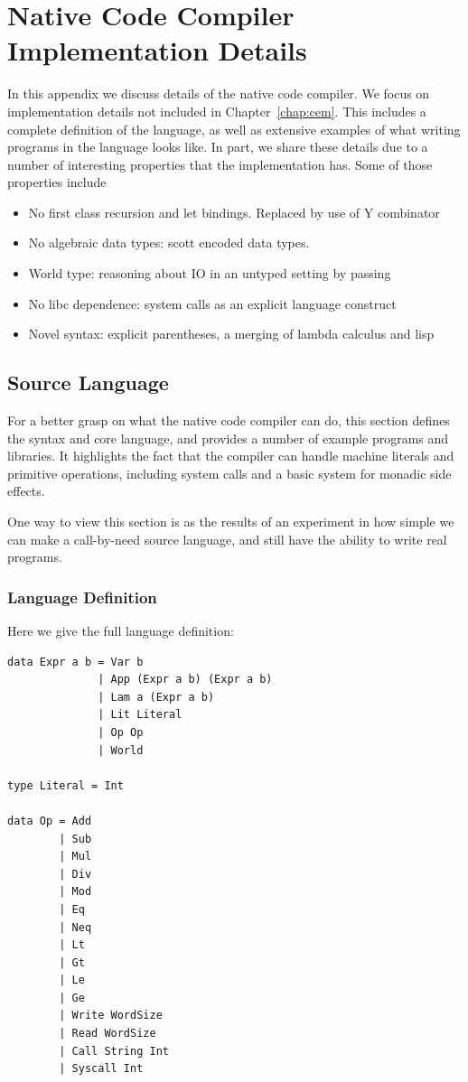 \chapter{Native Code Compiler Implementation Details}
In this appendix we discuss details of the native code compiler. We focus on
implementation details not included in Chapter~\ref{chap:cem}. This includes a
complete definition of the language, as well as extensive examples of what
writing programs in the language looks like. In part, we share these details due
to a number of interesting properties that the implementation has. Some of those
properties include

\begin{itemize}
\item No first class recursion and let bindings. Replaced by use of Y combinator
\item No algebraic data types: scott encoded data types. 
\item World type: reasoning about IO in an untyped setting by passing 
\item No libc dependence: system calls as an explicit language construct
\item Novel syntax: explicit parentheses, a merging of lambda calculus and lisp
\end{itemize}



\section{Source Language}

For a better grasp on what the \ce native code compiler can do, this section
defines the syntax and core language, and provides a number of example programs
and libraries. It highlights the fact that the compiler can handle machine
literals and primitive operations, including system calls and a basic system for
monadic side effects.  

One way to view this section is as the results of an experiment in how simple we
can make a call-by-need source language, and still have the ability to write
real programs. 

\subsection{Language Definition}

Here we give the full language definition: 

\begin{verbatim}
data Expr a b = Var b
              | App (Expr a b) (Expr a b)
              | Lam a (Expr a b)
              | Lit Literal
              | Op Op
              | World

type Literal = Int

data Op = Add 
        | Sub 
        | Mul 
        | Div 
        | Mod 
        | Eq 
        | Neq 
        | Lt 
        | Gt 
        | Le 
        | Ge 
        | Write WordSize 
        | Read WordSize 
        | Call String Int 
        | Syscall Int
\end{verbatim}

